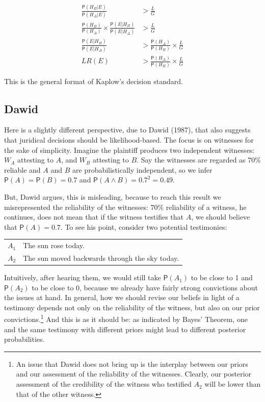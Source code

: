 \documentclass[10pt,dvipsnames,enabledeprecatedfontcommands]{scrartcl}
\newcommand{\et}{\wedge}
\newcommand{\pr}[1]{\mathsf{P}(#1)}
\begin{document}
\vspace{-6mm}

\begin{align}
\nonumber
\frac{\pr{H_\Pi \vert E}}{\pr{H_\Delta \vert E}} & > \frac{L}{G}\\
\nonumber
\frac{\pr{H_\Pi}}{\pr{H_\Delta}} \times \frac{\pr{E\vert H_\Pi}}{\pr{E\vert H_\Delta}} &> \frac{L}{G}\\
\nonumber
\frac{\pr{E\vert H_\Pi}}{\pr{E\vert H_\Delta}}  & > \frac{\pr{H_\Delta}}{\pr{H_\Pi}} \times \frac{L}{G}\\
\label{eq:Kaplow_decision2} LR(E)  & > \frac{\pr{H_\Delta}}{\pr{H_\Pi}} \times \frac{L}{G}
\end{align}

\noindent This is the general format of Kaplow's decision standard.

\hypertarget{dawid}{%
\subsection{Dawid}\label{dawid}}

Here is a slightly different perspective, due to Dawid (1987), that also
suggests that juridical decisions should be likelihood-based. The focus
is on witnesses for the sake of simplicity. Imagine the plaintiff
produces two independent witnesses: \(W_A\) attesting to \(A\), and
\(W_B\) attesting to \(B\). Say the witnesses are regarded as \(70\%\)
reliable and \(A\) and \(B\) are probabilistically independent, so we
infer \(\pr{A}=\pr{B}=0.7\) and \(\pr{A\et B}=0.7^2=0.49\).

But, Dawid argues, this is misleading, because to reach this result we
misrepresented the reliability of the witnesses: \(70\%\) reliability of
a witness, he continues, does not mean that if the witness testifies
that \(A\), we should believe that \(\pr{A}=0.7\). To see his point,
consider two potential testimonies:

\begin{center}
\begin{tabular}
{@{}ll@{}}
\toprule
  $A_1$ & The sun rose today. \\
   $A_2$ & The sun moved backwards through the sky today.\\
\bottomrule
\end{tabular}
\end{center}

\noindent     Intuitively, after hearing them, we would still take
\(\pr{A_1}\) to be close to 1 and \(\pr{A_2}\) to be close to 0, because
we already have fairly strong convictions about the issues at hand. In
general, how we should revise our beliefs in light of a testimony
depends not only on the reliability of the witness, but also on our
prior
convictions.\footnote{An issue that Dawid does not bring up is the interplay between our priors and our assessment of the reliability of the witnesses. Clearly, our posterior assessment of the credibility of the witness who testified $A_2$ will be lower than that of the other witness.}
And this is as it should be: as indicated by Bayes' Theorem, one and the
same testimony with different priors might lead to different posterior
probabilities.
\end{document}

